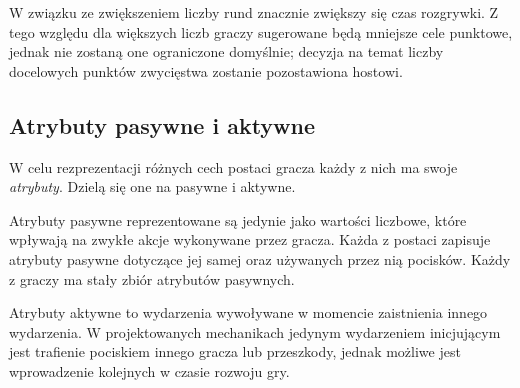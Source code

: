 W związku ze zwiększeniem liczby rund znacznie zwiększy się czas rozgrywki. Z tego względu dla większych liczb graczy sugerowane będą mniejsze cele punktowe, jednak nie zostaną one ograniczone domyślnie; decyzja na temat liczby docelowych punktów zwycięstwa zostanie pozostawiona hostowi.

\subsection{Atrybuty pasywne i aktywne}\label{sec:characteristics}

W celu rezprezentacji różnych cech postaci gracza każdy z nich ma swoje \emph{atrybuty}. Dzielą się one na pasywne i aktywne.

Atrybuty pasywne reprezentowane są jedynie jako wartości liczbowe, które wpływają na zwykłe akcje wykonywane przez gracza. Każda z postaci zapisuje atrybuty pasywne dotyczące jej samej oraz używanych przez nią pocisków. Każdy z graczy ma stały zbiór atrybutów pasywnych.

Atrybuty aktywne to wydarzenia wywoływane w momencie zaistnienia innego wydarzenia. W projektowanych mechanikach jedynym wydarzeniem inicjującym jest trafienie pociskiem innego gracza lub przeszkody, jednak możliwe jest wprowadzenie kolejnych w czasie rozwoju gry.


